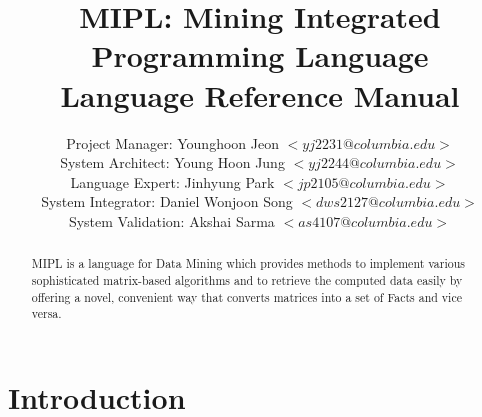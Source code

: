 \documentclass[prodmode,acmtecs]{acmsmall}
\begin{document}

\title{{MIPL: Mining Integrated Programming Language\\
Language Reference Manual}}
\author{Project Manager: Younghoon Jeon $<yj2231@columbia.edu>$\\
System Architect: Young Hoon Jung $<yj2244@columbia.edu>$\\
Language Expert: Jinhyung Park $<jp2105@columbia.edu>$\\
System Integrator: Daniel Wonjoon Song $<dws2127@columbia.edu>$\\
System Validation: Akshai Sarma $<as4107@columbia.edu>$
}

\begin{abstract}
MIPL is a language for Data Mining which provides methods to 
implement various sophisticated matrix-based algorithms and 
to retrieve the computed data easily by offering a novel,
convenient way that converts matrices into a set of Facts
and vice versa.
\end{abstract}






\maketitle

\tableofcontents 

\pagebreak

\lstset{frame=single}

\section{Introduction}
\end{document}
